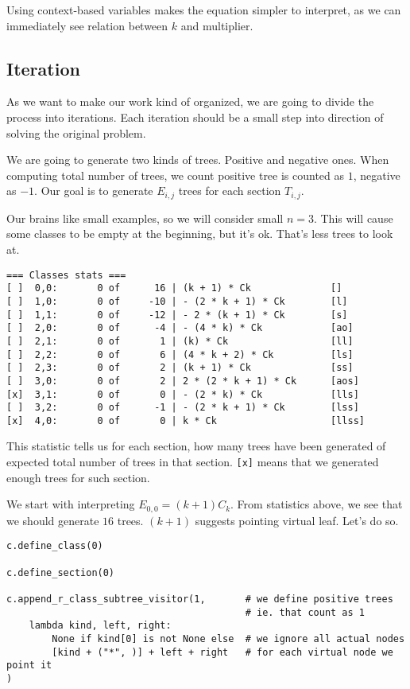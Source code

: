 \documentclass[final]{article}
\theoremstyle{definition}
\theoremstyle{remark}
\begin{document}
Using context-based variables makes the equation simpler to interpret, as we can immediately see relation between \(k\) and multiplier.

\subsection{Iteration}%
\label{sub:iteration}

As we want to make our work kind of organized, we are going to divide the process into iterations. Each iteration should be a small step into direction of solving the original problem.

We are going to generate two kinds of trees. Positive and negative ones. When computing total number of trees, we count positive tree is counted as \(1\), negative as \(-1\). Our goal is to generate \(E_{i, j}\) trees for each section \(T_{i, j}\).

Our brains like small examples, so we will consider small \(n = 3\). This will cause some classes to be empty at the beginning, but it's ok. That's less trees to look at.


\begin{lstlisting}
=== Classes stats ===
[ ]  0,0:       0 of      16 | (k + 1) * Ck              []
[ ]  1,0:       0 of     -10 | - (2 * k + 1) * Ck        [l]
[ ]  1,1:       0 of     -12 | - 2 * (k + 1) * Ck        [s]
[ ]  2,0:       0 of      -4 | - (4 * k) * Ck            [ao]
[ ]  2,1:       0 of       1 | (k) * Ck                  [ll]
[ ]  2,2:       0 of       6 | (4 * k + 2) * Ck          [ls]
[ ]  2,3:       0 of       2 | (k + 1) * Ck              [ss]
[ ]  3,0:       0 of       2 | 2 * (2 * k + 1) * Ck      [aos]
[x]  3,1:       0 of       0 | - (2 * k) * Ck            [lls]
[ ]  3,2:       0 of      -1 | - (2 * k + 1) * Ck        [lss]
[x]  4,0:       0 of       0 | k * Ck                    [llss]
\end{lstlisting}

This statistic tells us for each section, how many trees have been generated of expected total number of trees in that section. \verb|[x]| means that we generated enough trees for such section.

We start with interpreting \(E_{0,0} = (k + 1) C_k\). From statistics above, we see that we should generate \(16\) trees. \((k + 1)\) suggests pointing virtual leaf. Let's do so.

\begin{lstlisting}
c.define_class(0)

c.define_section(0)

c.append_r_class_subtree_visitor(1,       # we define positive trees
                                          # ie. that count as 1
    lambda kind, left, right:
        None if kind[0] is not None else  # we ignore all actual nodes
        [kind + ("*", )] + left + right   # for each virtual node we point it
)
\end{lstlisting}
\end{document}
